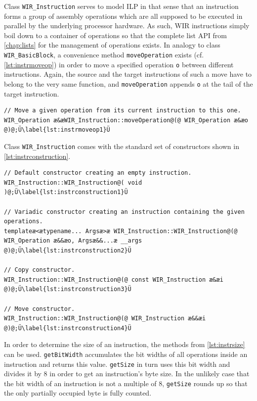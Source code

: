 Class \texttt{WIR\_Instruction} serves to model \gls{ILP} in that sense that an instruction forms a group of assembly operations which are all supposed to be executed in parallel by the underlying processor hardware.
As such, \gls{WIR} instructions simply boil down to a container of operations so that the complete list \gls{API} from \cref{chap:lists} for the management of operations exists.
In analogy to class \texttt{WIR\_BasicBlock}, a convenience method \texttt{moveOperation} exists (cf. \cref{lst:instrmoveop}) in order to move a specified operation \texttt{o} between different instructions.
Again, the source and the target instructions of such a move have to belong to the very same function, and \texttt{moveOperation} appends \texttt{o} at the tail of the target instruction.

\begin{lstlisting}[style=code,float=h,caption={Moving of Operations by Class \texttt{WIR\_Instruction}},label=lst:instrmoveop]
// Move a given operation from its current instruction to this one.
WIR_Operation æ&æWIR_Instruction::moveOperation@(@ WIR_Operation æ&æo @)@;Ü\label{lst:instrmoveop1}Ü
\end{lstlisting}

Class \texttt{WIR\_Instruction} comes with the standard set of constructors shown in \cref{lst:instrconstruction}.

\begin{lstlisting}[style=code,float=ht,caption={Constructors of Class \texttt{WIR\_Instruction}},label=lst:instrconstruction]
// Default constructor creating an empty instruction.
WIR_Instruction::WIR_Instruction@( void )@;Ü\label{lst:instrconstruction1}Ü

// Variadic constructor creating an instruction containing the given operations.
templateæ<ætypename... Argsæ>æ WIR_Instruction::WIR_Instruction@(@ WIR_Operation æ&&æo, Argsæ&&...æ __args @)@;Ü\label{lst:instrconstruction2}Ü

// Copy constructor.
WIR_Instruction::WIR_Instruction@(@ const WIR_Instruction æ&æi @)@;Ü\label{lst:instrconstruction3}Ü

// Move constructor.
WIR_Instruction::WIR_Instruction@(@ WIR_Instruction æ&&æi @)@;Ü\label{lst:instrconstruction4}Ü
\end{lstlisting}

In order to determine the size of an instruction, the methods from \cref{lst:instrsize} can be used.
\texttt{getBitWidth} accumulates the bit widths of all operations inside an instruction and returns this value.
\texttt{getSize} in turn uses this bit width and divides it by 8 in order to get an instruction's byte size.
In the unlikely case that the bit width of an instruction is not a multiple of 8, \texttt{getSize} rounds up so that the only partially occupied byte is fully counted.

